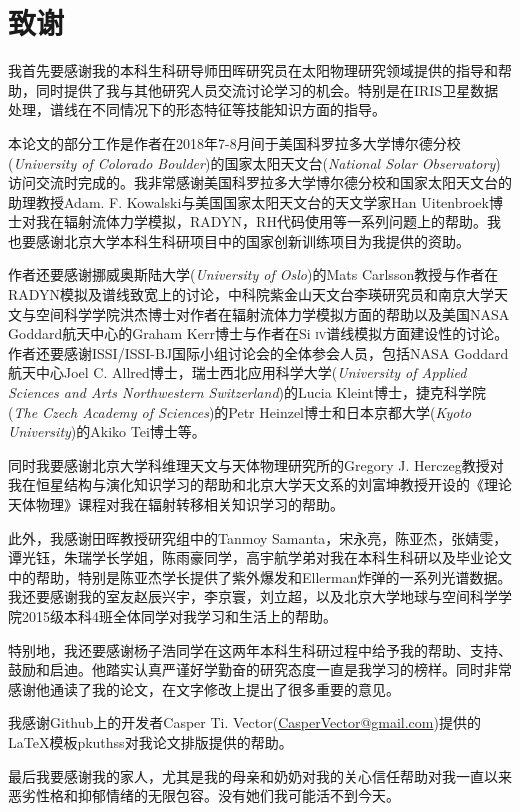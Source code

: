 
\chapter{致谢}
我首先要感谢我的本科生科研导师田晖研究员在太阳物理研究领域提供的指导和帮助，同时提供了我与其他研究人员交流讨论学习的机会。特别是在IRIS卫星数据处理，谱线在不同情况下的形态特征等技能知识方面的指导。

本论文的部分工作是作者在2018年7-8月间于美国科罗拉多大学博尔德分校(\textit{University of Colorado Boulder})的国家太阳天文台(\textit{National Solar Observatory})访问交流时完成的。我非常感谢美国科罗拉多大学博尔德分校和国家太阳天文台的助理教授Adam. F. Kowalski与美国国家太阳天文台的天文学家Han Uitenbroek博士对我在辐射流体力学模拟，RADYN，RH代码使用等一系列问题上的帮助。我也要感谢北京大学本科生科研项目中的国家创新训练项目为我提供的资助。

作者还要感谢挪威奥斯陆大学(\textit{University of Oslo})的Mats Carlsson教授与作者在RADYN模拟及谱线致宽上的讨论，中科院紫金山天文台李瑛研究员和南京大学天文与空间科学学院洪杰博士对作者在辐射流体力学模拟方面的帮助以及美国NASA Goddard航天中心的Graham Kerr博士与作者在Si \textsc{iv}谱线模拟方面建设性的讨论。作者还要感谢ISSI/ISSI-BJ国际小组讨论会的全体参会人员，包括NASA Goddard航天中心Joel C. Allred博士，瑞士西北应用科学大学(\textit{University of Applied Sciences and Arts Northwestern Switzerland})的Lucia Kleint博士，捷克科学院(\textit{The Czech Academy of Sciences})的Petr Heinzel博士和日本京都大学(\textit{Kyoto University})的Akiko Tei博士等。

同时我要感谢北京大学科维理天文与天体物理研究所的Gregory J. Herczeg教授对我在恒星结构与演化知识学习的帮助和北京大学天文系的刘富坤教授开设的《理论天体物理》课程对我在辐射转移相关知识学习的帮助。

此外，我感谢田晖教授研究组中的Tanmoy Samanta，宋永亮，陈亚杰，张婧雯，谭光钰，朱瑞学长学姐，陈雨豪同学，高宇航学弟对我在本科生科研以及毕业论文中的帮助，特别是陈亚杰学长提供了紫外爆发和Ellerman炸弹的一系列光谱数据。我还要感谢我的室友赵辰兴宇，李京寰，刘立超，以及北京大学地球与空间科学学院2015级本科4班全体同学对我学习和生活上的帮助。

特别地，我还要感谢杨子浩同学在这两年本科生科研过程中给予我的帮助、支持、鼓励和启迪。他踏实认真严谨好学勤奋的研究态度一直是我学习的榜样。同时非常感谢他通读了我的论文，在文字修改上提出了很多重要的意见。

我感谢Github上的开发者Casper Ti. Vector(\href{mailto:CasperVector@gmail.com}{CasperVector@gmail.com})提供的\LaTeX 模板pkuthss对我论文排版提供的帮助。

最后我要感谢我的家人，尤其是我的母亲和奶奶对我的关心信任帮助对我一直以来恶劣性格和抑郁情绪的无限包容。没有她们我可能活不到今天。

